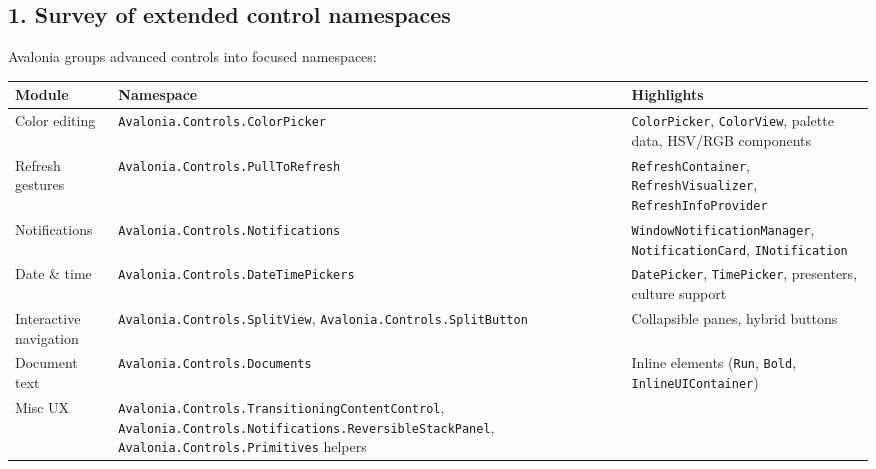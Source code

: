 \subsection{1. Survey of extended control
namespaces}\label{survey-of-extended-control-namespaces}

Avalonia groups advanced controls into focused namespaces:

\begin{longtable}[]{@{}
  >{\raggedright\arraybackslash}p{}
  >{\raggedright\arraybackslash}p{}
  >{\raggedright\arraybackslash}p{}@{}}
\toprule\noalign{}
\begin{minipage}[b]{\linewidth}\raggedright
Module
\end{minipage} & \begin{minipage}[b]{\linewidth}\raggedright
Namespace
\end{minipage} & \begin{minipage}[b]{\linewidth}\raggedright
Highlights
\end{minipage} \\
\midrule\noalign{}
\endhead
\bottomrule\noalign{}
\endlastfoot
Color editing & \passthrough{\lstinline!Avalonia.Controls.ColorPicker!}
& \passthrough{\lstinline!ColorPicker!},
\passthrough{\lstinline!ColorView!}, palette data, HSV/RGB components \\
Refresh gestures &
\passthrough{\lstinline!Avalonia.Controls.PullToRefresh!} &
\passthrough{\lstinline!RefreshContainer!},
\passthrough{\lstinline!RefreshVisualizer!},
\passthrough{\lstinline!RefreshInfoProvider!} \\
Notifications &
\passthrough{\lstinline!Avalonia.Controls.Notifications!} &
\passthrough{\lstinline!WindowNotificationManager!},
\passthrough{\lstinline!NotificationCard!},
\passthrough{\lstinline!INotification!} \\
Date \& time &
\passthrough{\lstinline!Avalonia.Controls.DateTimePickers!} &
\passthrough{\lstinline!DatePicker!},
\passthrough{\lstinline!TimePicker!}, presenters, culture support \\
Interactive navigation &
\passthrough{\lstinline!Avalonia.Controls.SplitView!},
\passthrough{\lstinline!Avalonia.Controls.SplitButton!} & Collapsible
panes, hybrid buttons \\
Document text & \passthrough{\lstinline!Avalonia.Controls.Documents!} &
Inline elements (\passthrough{\lstinline!Run!},
\passthrough{\lstinline!Bold!},
\passthrough{\lstinline!InlineUIContainer!}) \\
Misc UX &
\passthrough{\lstinline!Avalonia.Controls.TransitioningContentControl!},
\passthrough{\lstinline!Avalonia.Controls.Notifications.ReversibleStackPanel!},
\passthrough{\lstinline!Avalonia.Controls.Primitives!} helpers & \\
\end{longtable}

